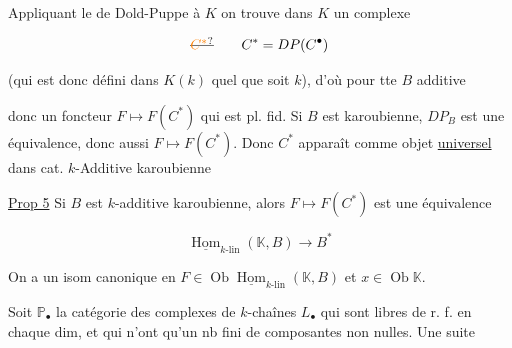 Appliquant le  de Dold-Puppe à $K$  on trouve dans $K$ un complexe

\[
 \deleted{\unsure{C^{*}}}\qquad C^{*}=DP(C^{\bullet})
\]

 (qui est donc défini dans  $K(k)$ quel que soit $k$), d'où pour tte $B$ additive


donc un foncteur $F\mapsto F(C^{*})$ qui est pl. fid. Si $B$ est karoubienne, $DP_B$ est une équivalence, donc aussi $F\mapsto F(C^{*})$. Donc $C^{*}$ apparaît comme objet  \uline{universel} dans cat. $k$-Additive karoubienne

\uline{Prop 5} Si $B$ est $k$-additive karoubienne, alors $F\mapsto F(C^{*})$ est une équivalence

\[
 \underline{\operatorname{Hom}}_{k\text{-}\mathrm{lin}}(\mathbb K,B)\longrightarrow B^{*}
\]

On a un isom canonique  en $F\in\operatorname{Ob}\underline{\operatorname{Hom}}_{k\text{-}\mathrm{lin}}(\mathbb K,B)$ et $x\in\operatorname{Ob}\mathbb K$.

\margin{\unsure{$\wr$}}




Soit $\mathbb P_{\bullet}$ la catégorie des complexes de $k$-chaînes $L_{\bullet}$ qui sont libres de r. f. en chaque dim, et qui n'ont qu'un nb fini de composantes non nulles. Une suite

